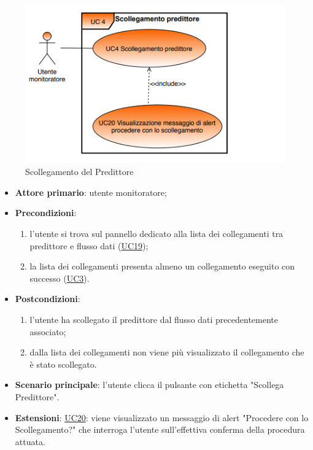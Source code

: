 		\begin{figure}[H]
		\centering
		\includegraphics[scale=0.80]{../Analisi_dei_requisiti/img/Diagrammi_UML/UC4_Scollegamento_predittore.png}
		\caption{Scollegamento del Predittore}
		\end{figure}	

		\begin{itemize}
			\item\textbf{Attore primario}: utente monitoratore;
			\item\textbf{Precondizioni}: 
				\begin{enumerate}
					\item l'utente si trova sul pannello dedicato alla lista dei collegamenti tra predittore e flusso dati (\hyperref[par:UC19]{UC19});
					\item la lista dei collegamenti presenta almeno un collegamento eseguito con successo  (\hyperref[par:UC3]{UC3}).
				\end{enumerate}
			\item\textbf{Postcondizioni}: 
				\begin{enumerate}
					\item l’utente ha scollegato il predittore dal flusso dati precedentemente associato; 
					\item dalla lista dei collegamenti non viene più visualizzato il collegamento che è stato scollegato.
				\end{enumerate}
			\item\textbf{Scenario principale}: l'utente clicca il pulsante con etichetta "Scollega Predittore".
			\item\textbf{Estensioni}: \hyperref[par:UC20]{UC20}: viene visualizzato un messaggio di alert "Procedere con lo  Scollegamento?" che interroga l'utente sull'effettiva conferma della procedura attuata. 
		\end{itemize}	


